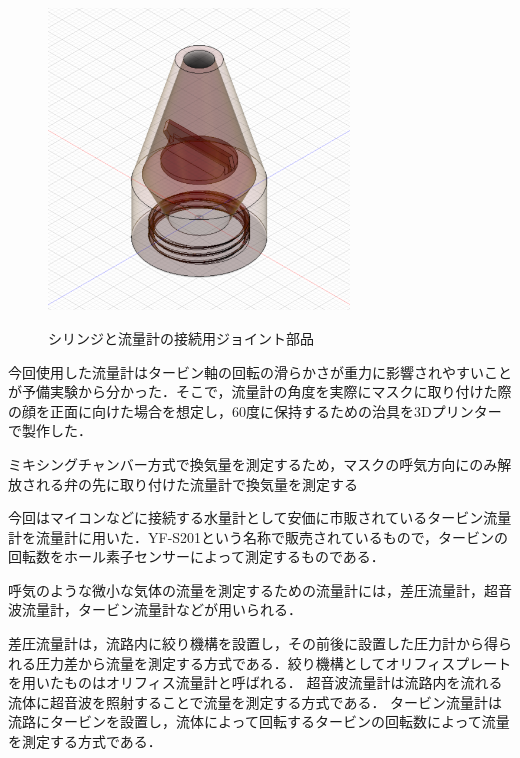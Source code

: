 \begin{figure}[h]
  \begin{center}
    \label{fig:syringe_cone}
    \includegraphics[width=8cm]{fig/syringe_cone}
    \caption{シリンジと流量計の接続用ジョイント部品}
  \end{center}
\end{figure}

今回使用した流量計はタービン軸の回転の滑らかさが重力に影響されやすいことが予備実験から分かった．そこで，流量計の角度を実際にマスクに取り付けた際の顔を正面に向けた場合を想定し，60度に保持するための治具を3Dプリンターで製作した．

ミキシングチャンバー方式で換気量を測定するため，マスクの呼気方向にのみ解放される弁の先に取り付けた流量計で換気量を測定する

今回はマイコンなどに接続する水量計として安価に市販されているタービン流量計を流量計に用いた．YF-S201という名称で販売されているもので，タービンの回転数をホール素子センサーによって測定するものである．

呼気のような微小な気体の流量を測定するための流量計には，差圧流量計，超音波流量計，タービン流量計などが用いられる．

差圧流量計は，流路内に絞り機構を設置し，その前後に設置した圧力計から得られる圧力差から流量を測定する方式である．絞り機構としてオリフィスプレートを用いたものはオリフィス流量計と呼ばれる．
超音波流量計は流路内を流れる流体に超音波を照射することで流量を測定する方式である．
タービン流量計は流路にタービンを設置し，流体によって回転するタービンの回転数によって流量を測定する方式である．


